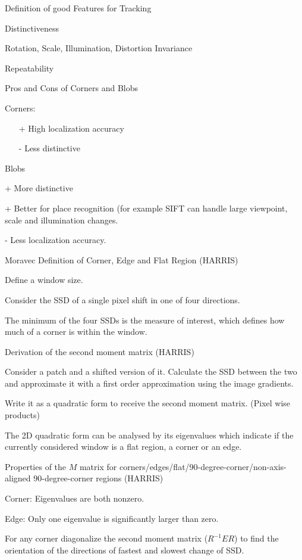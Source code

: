 \documentclass[10pt,a4paper]{scrartcl}
\begin{document}
\begin{multicols*}{2}
\begin{QandA}{Definition of good Features for Tracking}
\item Distinctiveness
\item Rotation, Scale, Illumination, Distortion Invariance
\item Repeatability
\end{QandA}

\begin{QandA}{Pros and Cons of Corners and Blobs}
\item Corners:
\begin{itemize}
\item[+] High localization accuracy
\item[-] Less distinctive
\end{itemize}
\item Blobs
\item[+] More distinctive
\item[+] Better for place recognition (for example SIFT can handle large viewpoint, scale and illumination changes.
\item[-] Less localization accuracy.
\end{QandA}

\begin{QandA}{Moravec Definition of Corner, Edge and Flat Region (HARRIS)}
\item Define a window size.
\item Consider the SSD of a single pixel shift in one of four directions.
\item The minimum of the four SSDs is the measure of interest, which defines how much of a corner is within the window.
\end{QandA}

\begin{QandA}{Derivation of the second moment matrix (HARRIS)}
\item Consider a patch and a shifted version of it. Calculate the SSD between the two and approximate it with a first order approximation using the image gradients.
\item Write it as a quadratic form to receive the second moment matrix. (Pixel wise products)
\item The 2D quadratic form can be analysed by its eigenvalues which indicate if the currently considered window is a flat region, a corner or an edge.
\end{QandA}

\begin{QandA}{Properties of the $M$ matrix for corners/edges/flat/90-degree-corner/non-axis-aligned 90-degree-corner regions (HARRIS)}
\item Corner: Eigenvalues are both nonzero.
\item Edge: Only one eigenvalue is significantly larger than zero.
\item For any corner diagonalize the second moment matrix ($R^{-1}ER$) to find the orientation of the directions of fastest and slowest change of SSD. 
\end{QandA}


\end{multicols*}
\end{document}
